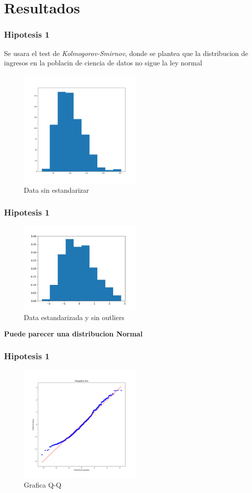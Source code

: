 \documentclass{beamer}
\begin{document}
\section{Resultados}
\begin{frame}
\frametitle{Hipotesis 1}
  Se usara el test de \textit{Kolmogorov-Smirnov}, donde se plantea
  que la distribucion de ingresos en la poblacin de ciencia de datos
  no sigue la ley normal
\begin{figure}[t]
  \caption{Data sin estandarizar}
  \includegraphics[width=6cm]{Figure_1.png}
\end{figure}
\end{frame}

\begin{frame}
\frametitle{Hipotesis 1}
\begin{figure}[t]
  \caption{Data estandarizada y sin outliers}
  \includegraphics[width=6cm]{data_sin_outliers.jpeg}
\end{figure}
  \textbf{Puede parecer una distribucion Normal}

\end{frame}

\begin{frame}
\frametitle{Hipotesis 1}
\begin{figure}[t]
  \caption{Grafica Q-Q}
  \includegraphics[width=6cm]{grafiaq-q.png}
\end{figure}
\end{frame}
\end{document}
